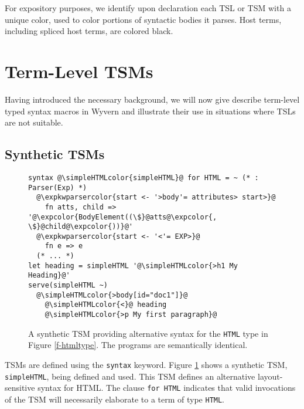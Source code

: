 \documentclass{sig-alternate}[10pt]
\newcommand{\lstinlinew}[1]{\lstinline[style=wyvern]{#1}}
\newcommand{\expkwparsercolor}[1]{\textcolor[HTML]{336699}{#1}}
\newcommand{\expcolor}[1]{\textcolor[HTML]{FF0033}{#1}}
\newcommand{\simpleHTMLcolor}[1]{\textcolor[HTML]{7D5100}{#1}}
\newcommand{\mycaption}[1]{\vspace{-10px}\caption{#1}\vspace{-10px}}
\begin{document}
For expository purposes, we identify upon declaration each TSL or TSM with a unique color, used to color portions of syntactic bodies it parses. Host terms, including spliced host terms, are colored black. 

\section{Term-Level TSM\lowercase{s}}\label{tsms-term}
Having introduced the necessary background, we will now give describe term-level typed syntax macros in Wyvern and illustrate their use in situations where TSLs are not suitable. %


\subsection{Synthetic TSMs}

\begin{figure}[t]
\begin{lstlisting}[style=wyvern]
syntax @\simpleHTMLcolor{simpleHTML}@ for HTML = ~ (* : Parser(Exp) *)
  @\expkwparsercolor{start <- '>body'= attributes> start>}@
    fn atts, child => '@\expcolor{BodyElement((\$}@atts@\expcolor{, \$}@child@\expcolor{))}@'
  @\expkwparsercolor{start <- '<'= EXP>}@
    fn e => e
  (* ... *)
let heading = simpleHTML '@\simpleHTMLcolor{>h1 My Heading}@'
serve(simpleHTML ~)
  @\simpleHTMLcolor{>body[id="doc1"]}@
    @\simpleHTMLcolor{<}@ heading
    @\simpleHTMLcolor{>p My first paragraph}@
\end{lstlisting}
\mycaption{A synthetic TSM providing alternative syntax for the \texttt{HTML} type in Figure \ref{f-htmltype}. The programs are semantically identical.}
\label{f-simplehtml}
\end{figure}
TSMs are defined using the \lstinlinew{syntax} keyword. Figure \ref{f-simplehtml} shows a synthetic TSM, \lstinlinew{simpleHTML}, being defined and used. This TSM defines an alternative layout-sensitive syntax for HTML. The clause \lstinlinew{for HTML} indicates that valid invocations of the TSM will necessarily elaborate to a term of type \lstinlinew{HTML}. 
\end{document}
